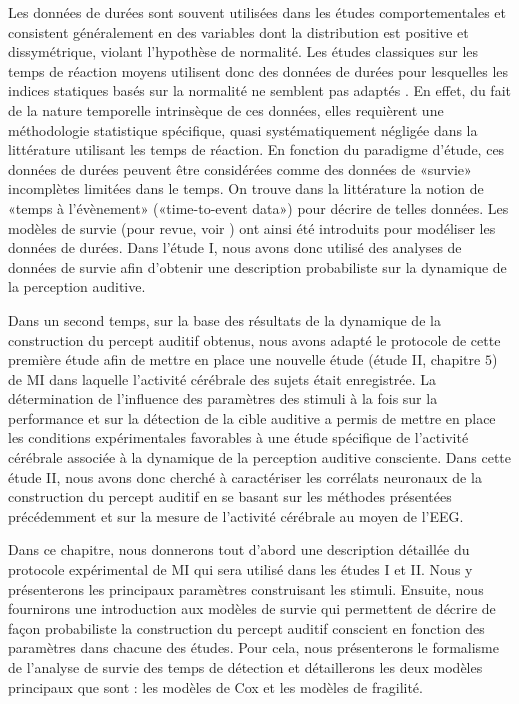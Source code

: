 Les données de durées sont souvent utilisées dans les études comportementales et consistent généralement en des variables dont la distribution est positive et dissymétrique, violant l'hypothèse de normalité. 
Les études classiques sur les temps de réaction moyens utilisent donc des données de durées pour lesquelles les indices statiques basés sur la normalité ne semblent pas adaptés \citep{george2014survival, letue2018statistical}. 
En effet, du fait de la nature temporelle intrinsèque de ces données, elles requièrent une méthodologie statistique spécifique, quasi systématiquement négligée dans la littérature utilisant les temps de réaction. 
En fonction du paradigme d'étude, ces données de durées peuvent être considérées comme des données de «survie» incomplètes limitées dans le temps. 
On trouve dans la littérature la notion de «temps à l'évènement» («time-to-event data») pour décrire de telles données. 
Les modèles de survie (pour revue, voir \cite{andersen1993statistical}) ont ainsi été introduits pour modéliser les données de durées. 
Dans l'étude I, nous avons donc utilisé des analyses de données de survie afin d'obtenir une description probabiliste sur la dynamique de la perception auditive. 

Dans un second temps, sur la base des résultats de la dynamique de la construction du percept auditif obtenus, nous avons adapté le protocole de cette première étude afin de mettre en place une nouvelle étude (étude II, chapitre $5$) de MI dans laquelle l'activité cérébrale des sujets était enregistrée. 
La détermination de l'influence des paramètres des stimuli à la fois sur la performance et sur la détection de la cible auditive a permis de mettre en place les conditions expérimentales favorables à une étude spécifique de l'activité cérébrale associée à la dynamique de la perception auditive consciente. 
Dans cette étude II, nous avons donc cherché à caractériser les corrélats neuronaux de la construction du percept auditif en se basant sur les méthodes présentées précédemment et sur la mesure de l'activité cérébrale au moyen de l'EEG. 

Dans ce chapitre, nous donnerons tout d'abord une description détaillée du protocole expérimental de MI qui sera utilisé dans les études I et II. 
Nous y présenterons les principaux paramètres construisant les stimuli. 
Ensuite, nous fournirons une introduction aux modèles de survie qui permettent de décrire de façon probabiliste la construction du percept auditif conscient en fonction des paramètres dans chacune des études. 
Pour cela, nous présenterons le formalisme de l'analyse de survie des temps de détection et détaillerons les deux modèles principaux que sont : les modèles de Cox et les modèles de fragilité.


